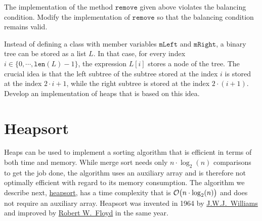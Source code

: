 \exercise
The implementation of the method $\texttt{remove}$ given above violates the balancing condition.
Modify the implementation of $\texttt{remove}$ so that the balancing condition remains valid. \eox

\exercise
Instead of defining a class with member variables $\texttt{mLeft}$ and $\texttt{mRight}$, a binary tree
can be stored as a list $L$.  In that case, for every index $i \in \bigl\{0, \cdots, \texttt{len}(L)-1 \bigl\}$,
the expression $L[i]$ stores a node of the tree.  The crucial idea is that the left subtree of the
subtree stored at the index $i$ is stored at the index $2 \cdot i + 1$, while the right subtree is
stored at the index $2 \cdot (i + 1)$.  Develop an implementation of heaps that is based on this idea.
\eox

\section{Heapsort \label{sec:heapsort}}
Heaps can be used to implement a sorting algorithm that is efficient in terms of both time and
memory. While merge sort needs only $n \cdot \log_2(n)$ comparisons to get the job done, the
algorithm uses an auxiliary array and is therefore not optimally efficient with regard to its memory
consumption.  The algorithm we describe next, \href{https://en.wikipedia.org/wiki/Heapsort}{heapsort}, has
a time complexity that is $\mathcal{O}\bigl(n \cdot \log_2(n)\bigr)$ and does not require an auxiliary
array.  Heapsort was invented in 1964 by \href{https://en.wikipedia.org/wiki/J._W._J._Williams}{J.W.J.~Williams} and
improved by \href{https://en.wikipedia.org/wiki/Robert_W._Floyd}{Robert W.~Floyd} in the same year.

